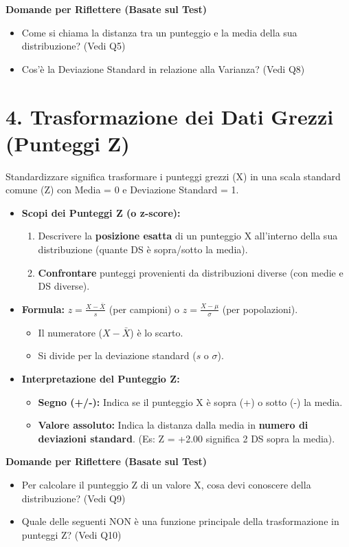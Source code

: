 \documentclass[12pt, a4paper]{article}
\newenvironment{reflectionbox}{%
    \medskip %
    \begin{framed}\par\noindent
    \textbf{\color{boxtitlecolor}Domande per Riflettere (Basate sul Test)} \par
    \begin{itemize}[leftmargin=*, label=$\blacktriangleright$]
}{%
    \end{itemize}\par
    \end{framed}
    \medskip %
}
\newcommand{\popmean}{\mu} %
\newcommand{\samplemean}{\bar{X}} %
\newcommand{\popsd}{\sigma} %
\newcommand{\samplesd}{s} %
\begin{document}
\begin{reflectionbox}
    \item Come si chiama la distanza tra un punteggio e la media della sua distribuzione? (Vedi Q5)
    \item Cos'è la Deviazione Standard in relazione alla Varianza? (Vedi Q8)
\end{reflectionbox}

\section*{4. Trasformazione dei Dati Grezzi (Punteggi Z)}
Standardizzare significa trasformare i punteggi grezzi (X) in una scala standard comune (Z) con Media = 0 e Deviazione Standard = 1.
\begin{itemize}
    \item \textbf{Scopi dei Punteggi Z (o z-score):}
        \begin{enumerate}
            \item Descrivere la \textbf{posizione esatta} di un punteggio X all'interno della sua distribuzione (quante DS è sopra/sotto la media).
            \item \textbf{Confrontare} punteggi provenienti da distribuzioni diverse (con medie e DS diverse).
        \end{enumerate}
    \item \textbf{Formula:} $z = \frac{X - \samplemean}{\samplesd}$ (per campioni) o $z = \frac{X - \popmean}{\popsd}$ (per popolazioni).
        \begin{itemize}
            \item Il numeratore ($X - \samplemean$) è lo scarto.
            \item Si divide per la deviazione standard ($\samplesd$ o $\popsd$).
        \end{itemize}
    \item \textbf{Interpretazione del Punteggio Z:}
        \begin{itemize}
            \item \textbf{Segno (+/-):} Indica se il punteggio X è sopra (+) o sotto (-) la media.
            \item \textbf{Valore assoluto:} Indica la distanza dalla media in \textbf{numero di deviazioni standard}. (Es: Z = +2.00 significa 2 DS sopra la media).
        \end{itemize}
\end{itemize}

\begin{reflectionbox}
    \item Per calcolare il punteggio Z di un valore X, cosa devi conoscere della distribuzione? (Vedi Q9)
    \item Quale delle seguenti NON è una funzione principale della trasformazione in punteggi Z? (Vedi Q10)
\end{reflectionbox}
\end{document}
